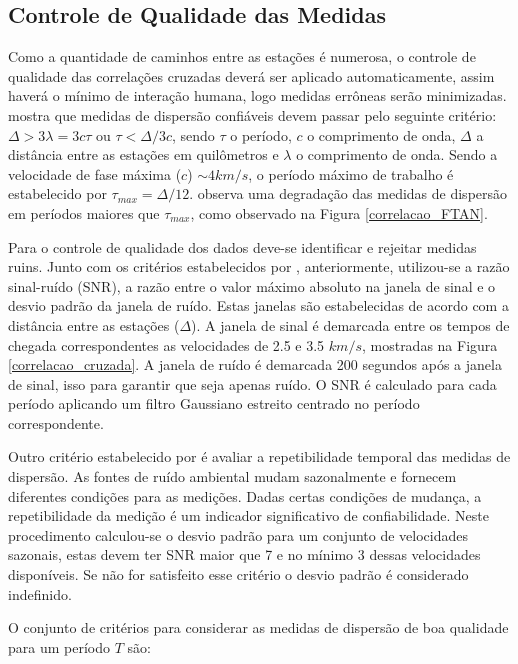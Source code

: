 \subsection{Controle de Qualidade das Medidas}

Como a quantidade de caminhos entre as estações é numerosa, o controle de qualidade das correlações cruzadas deverá ser aplicado automaticamente, assim haverá o mínimo de interação humana, logo medidas errôneas serão minimizadas. \cite{bensen_processing_2007} mostra que medidas de dispersão confiáveis devem passar pelo seguinte critério: $\Delta > 3\lambda = 3c\tau$ ou $\tau < \Delta/3c$, sendo $\tau$ o período, $c$ o comprimento de onda, $\Delta$ a distância entre as estações em quilômetros e $\lambda$ o comprimento de onda. Sendo a velocidade de fase máxima ($c$) $\sim 4 km/s$, o período máximo de trabalho é estabelecido por $\tau_{max} = \Delta/12$. \cite{bensen_processing_2007} observa uma degradação das medidas de dispersão em períodos maiores que $\tau_{max}$, como observado na Figura \ref{correlacao_FTAN}. 

Para o controle de qualidade dos dados deve-se identificar e rejeitar medidas ruins. Junto com os critérios estabelecidos por \cite{bensen_processing_2007}, anteriormente, utilizou-se a razão sinal-ruído (SNR), a razão entre o valor máximo absoluto na janela de sinal e o desvio padrão da janela de ruído. Estas janelas são estabelecidas de acordo com a distância entre as estações ($\Delta$). A janela de sinal é demarcada entre os tempos de chegada correspondentes as velocidades de 2.5 e 3.5 $km/s$, mostradas na Figura \ref{correlacao_cruzada}. A janela de ruído é demarcada 200 segundos após a janela de sinal, isso para garantir que seja apenas ruído. O SNR é calculado para cada período aplicando um filtro Gaussiano estreito centrado no período correspondente.

Outro critério estabelecido por \cite{bensen_processing_2007} é avaliar a repetibilidade temporal das medidas de dispersão. As fontes de ruído ambiental mudam sazonalmente e fornecem diferentes condições para as medições. Dadas certas condições de mudança, a repetibilidade da medição é um indicador significativo de confiabilidade. Neste procedimento calculou-se o desvio padrão para um conjunto de velocidades sazonais, estas devem ter SNR maior que 7 e no mínimo 3 dessas velocidades disponíveis. Se não for satisfeito esse critério o desvio padrão é considerado indefinido.

O conjunto de critérios para considerar as medidas de dispersão de boa qualidade para um período $T$ são:

